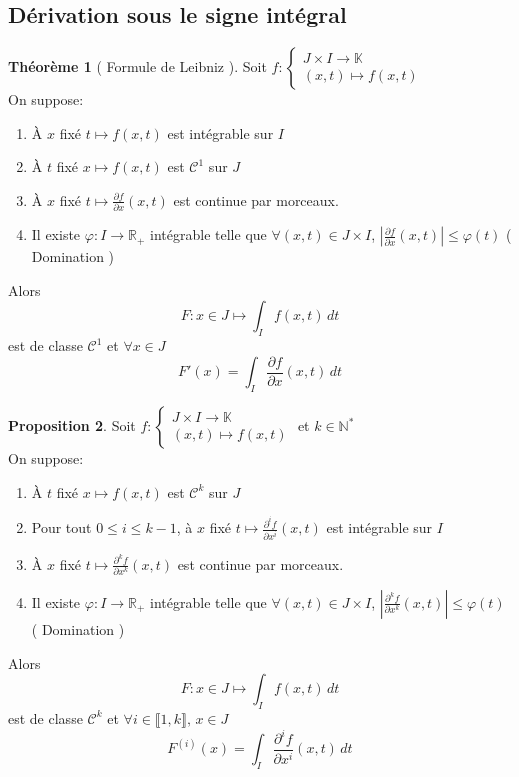 \documentclass[10pt,a4paper]{article}
\theoremstyle{definition}
\newtheorem{proposition}{Proposition}[section]
\newtheorem{theorem}[proposition]{Théorème}
\begin{document}
\subsection{Dérivation sous le signe intégral}
\begin{theorem}[ Formule de Leibniz ]
    Soit \(f:\begin{cases} J \times I \to \mathbb{K} \\ (x, t) \mapsto f(x, t)\end{cases}\) \\
    On suppose:
    \begin{enumerate}
        \item À \(x\) fixé \(t \mapsto f(x, t)\) est intégrable sur \(I\)
        \item À \(t\) fixé \(x \mapsto f(x, t)\) est \(\mathcal{C}^1\) sur \(J\)
        \item À \(x\) fixé \(t \mapsto \frac{\partial f}{\partial x}(x, t)\) est continue par morceaux.
        \item Il existe \(\varphi: I \to \mathbb{R}_+\) intégrable telle que \(\forall (x, t) \in J \times I\), \(\left| \frac{\partial f}{\partial x}(x, t) \right| \leq \varphi(t)\) ( Domination )
    \end{enumerate}
    Alors \[F: x \in J \mapsto \int_{I} f(x, t) \,dt\] est de classe \(\mathcal{C}^1\) et \(\forall x \in J\)
    \[F'(x) = \int_{I} \frac{\partial f}{\partial x}(x, t) \,dt\]
\end{theorem}
\begin{proposition}
    Soit \(f:\begin{cases} J \times I \to \mathbb{K} \\ (x, t) \mapsto f(x, t)\end{cases}\) et \(k \in \mathbb{N}^*\) \\
    On suppose:
    \begin{enumerate}
        \item À \(t\) fixé \(x \mapsto f(x, t)\) est \(\mathcal{C}^k\) sur \(J\)
        \item Pour tout \(0 \leq i \leq k - 1\), à \(x\) fixé \(t \mapsto \frac{\partial^i f}{\partial x^i}(x, t)\) est intégrable sur \(I\)
        \item À \(x\) fixé \(t \mapsto \frac{\partial^k f}{\partial x^k}(x, t)\) est continue par morceaux.
        \item Il existe \(\varphi: I \to \mathbb{R}_+\) intégrable telle que \(\forall (x, t) \in J \times I\), \(\left| \frac{\partial^k f}{\partial x^k}(x, t) \right| \leq \varphi(t)\) ( Domination )
    \end{enumerate}
    Alors \[F: x \in J \mapsto \int_{I} f(x, t) \,dt\] est de classe \(\mathcal{C}^k\) et \(\forall i \in \llbracket 1, k \rrbracket,\, x \in J\)
    \[\boxed{F^{(i)}(x) = \int_{I} \frac{\partial^i f}{\partial x^i}(x, t) \,dt}\]
\end{proposition}
\end{document}
